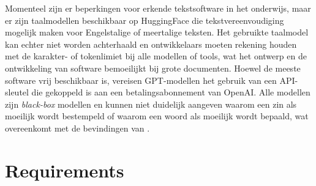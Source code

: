 
Momenteel zijn er beperkingen voor erkende tekstsoftware in het onderwijs, maar er zijn taalmodellen beschikbaar op HuggingFace die tekstvereenvoudiging mogelijk maken voor Engelstalige of meertalige teksten. Het gebruikte taalmodel kan echter niet worden achterhaald en ontwikkelaars moeten rekening houden met de karakter- of tokenlimiet bij alle modellen of tools, wat het ontwerp en de ontwikkeling van software bemoeilijkt bij grote documenten. Hoewel de meeste software vrij beschikbaar is, vereisen GPT-modellen het gebruik van een API-sleutel die gekoppeld is aan een betalingsabonnement van OpenAI. Alle modellen zijn \textit{black-box} modellen en kunnen niet duidelijk aangeven waarom een zin als moeilijk wordt bestempeld of waarom een woord als moeilijk wordt bepaald, wat overeenkomt met de bevindingen van \textcite{Gooding2022}.

\section{Requirements}

